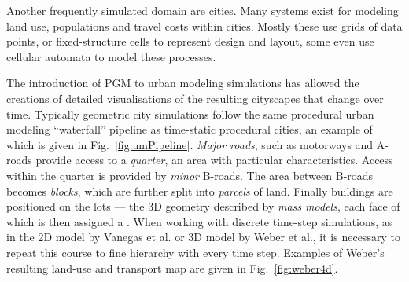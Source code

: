 






Another frequently simulated domain are cities. Many systems exist for modeling land use, populations and travel costs within cities\cite{Waddell:2002,Simmonds99}. Mostly these use grids of data points, or fixed-structure cells to represent design and layout, some even use cellular automata to model these processes\cite{Kheder08,Honda04}. 


The introduction of PGM to urban modeling simulations has allowed the creations of detailed visualisations of the resulting cityscapes that change over time. Typically geometric city simulations follow the same procedural urban modeling ``waterfall'' pipeline as time-static procedural cities\cite{Parish01}, an example of which is given in Fig.~\ref{fig:umPipeline}. \emph{Major roads}, such as motorways and A-roads provide access to a \emph{quarter}, an area with particular characteristics. Access within the quarter is provided by \emph{minor} B-roads. The area between B-roads becomes \emph{blocks}, which are further split into \emph{parcels} of land. Finally buildings are positioned on the lots --- the 3D geometry described by \emph{mass models}, each face of which is then assigned a \facade{}. When working with discrete time-step simulations, as in the 2D model by Vanegas et al.\cite{Vanegas09:VOS} or 3D model by Weber et al.\cite{Weber09}, it is necessary to repeat this course to fine hierarchy with every time step. Examples of Weber's resulting land-use and transport map are given in Fig.~\ref{fig:weber4d}. 


